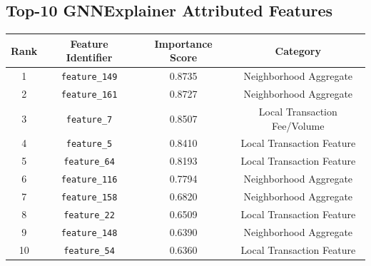 \documentclass[11pt,a4paper]{report}
\begin{document}
\subsection{Top-10 GNNExplainer Attributed Features}
\begin{longtable}{cccc}
\toprule
\textbf{Rank} & \textbf{Feature Identifier} & \textbf{Importance Score} & \textbf{Category} \\
\midrule
1 & \texttt{feature\_149} & 0.8735 & Neighborhood Aggregate \\
2 & \texttt{feature\_161} & 0.8727 & Neighborhood Aggregate \\
3 & \texttt{feature\_7}   & 0.8507 & Local Transaction Fee/Volume \\
4 & \texttt{feature\_5}   & 0.8410 & Local Transaction Feature \\
5 & \texttt{feature\_64}  & 0.8193 & Local Transaction Feature \\
6 & \texttt{feature\_116} & 0.7794 & Neighborhood Aggregate \\
7 & \texttt{feature\_158} & 0.6820 & Neighborhood Aggregate \\
8 & \texttt{feature\_22}  & 0.6509 & Local Transaction Feature \\
9 & \texttt{feature\_148} & 0.6390 & Neighborhood Aggregate \\
10 & \texttt{feature\_54} & 0.6360 & Local Transaction Feature \\
\bottomrule
\end{longtable}
\end{document}
